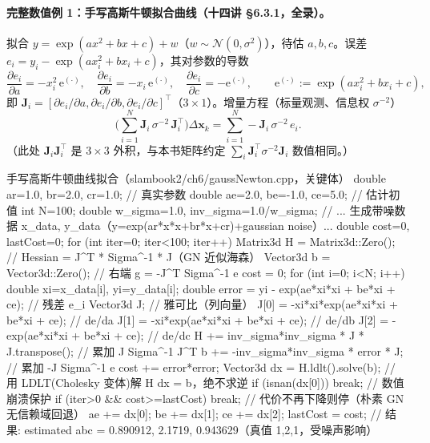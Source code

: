 \paragraph{完整数值例 1：手写高斯牛顿拟合曲线（十四讲 §6.3.1，全录）。}\cite{gaoxiang2019slam14}
拟合 $y=\exp(ax^2+bx+c)+w$（$w\sim\mathcal{N}(0,\sigma^2)$），待估 $a,b,c$。误差 $e_i=y_i-\exp(ax_i^2+bx_i+c)$，其对参数的导数
\begin{equation}
  \frac{\partial e_i}{\partial a}=-x_i^2\,\mathrm{e}^{(\cdot)},\quad
  \frac{\partial e_i}{\partial b}=-x_i\,\mathrm{e}^{(\cdot)},\quad
  \frac{\partial e_i}{\partial c}=-\mathrm{e}^{(\cdot)},\qquad \mathrm{e}^{(\cdot)}:=\exp(ax_i^2+bx_i+c),
  \label{eq:nlopt-curve-jac}
\end{equation}
即 $\mathbf{J}_i=[\partial e_i/\partial a,\partial e_i/\partial b,\partial e_i/\partial c]^\top$（$3\times1$）。增量方程（标量观测、信息权 $\sigma^{-2}$）
\begin{equation}
  \Big(\sum_{i=1}^{N}\mathbf{J}_i\,\sigma^{-2}\,\mathbf{J}_i^\top\Big)\Delta\mathbf{x}_k=\sum_{i=1}^{N}-\mathbf{J}_i\,\sigma^{-2}\,e_i.
  \label{eq:nlopt-curve-gn}
\end{equation}
（此处 $\mathbf{J}_i\mathbf{J}_i^\top$ 是 $3\times3$ 外积，与本书矩阵约定 $\sum_i\mathbf{J}_i^\top\sigma^{-2}\mathbf{J}_i$ 数值相同。）

\begin{codebox}[C++]{手写高斯牛顿曲线拟合（slambook2/ch6/gaussNewton.cpp，关键体）}
double ar=1.0, br=2.0, cr=1.0;       // 真实参数
double ae=2.0, be=-1.0, ce=5.0;      // 估计初值
int N=100; double w_sigma=1.0, inv_sigma=1.0/w_sigma;
// ... 生成带噪数据 x_data, y_data（y=exp(ar*x*x+br*x+cr)+gaussian noise）...
double cost=0, lastCost=0;
for (int iter=0; iter<100; iter++) {
  Matrix3d H = Matrix3d::Zero();     // Hessian = J^T * Sigma^-1 * J（GN 近似海森）
  Vector3d b = Vector3d::Zero();     // 右端 g = -J^T Sigma^-1 e
  cost = 0;
  for (int i=0; i<N; i++) {
    double xi=x_data[i], yi=y_data[i];
    double error = yi - exp(ae*xi*xi + be*xi + ce);   // 残差 e_i
    Vector3d J;                                        // 雅可比（列向量）
    J[0] = -xi*xi*exp(ae*xi*xi + be*xi + ce);          // de/da
    J[1] = -xi*exp(ae*xi*xi + be*xi + ce);             // de/db
    J[2] = -exp(ae*xi*xi + be*xi + ce);                // de/dc
    H += inv_sigma*inv_sigma * J * J.transpose();      // 累加 J Sigma^-1 J^T
    b += -inv_sigma*inv_sigma * error * J;             // 累加 -J Sigma^-1 e
    cost += error*error;
  }
  Vector3d dx = H.ldlt().solve(b);   // 用 LDLT(Cholesky 变体)解 H dx = b，绝不求逆
  if (isnan(dx[0])) break;           // 数值崩溃保护
  if (iter>0 && cost>=lastCost) break;  // 代价不再下降则停（朴素 GN 无信赖域回退）
  ae += dx[0]; be += dx[1]; ce += dx[2];
  lastCost = cost;
}
// 结果: estimated abc = 0.890912, 2.1719, 0.943629（真值 1,2,1，受噪声影响）
\end{codebox}


